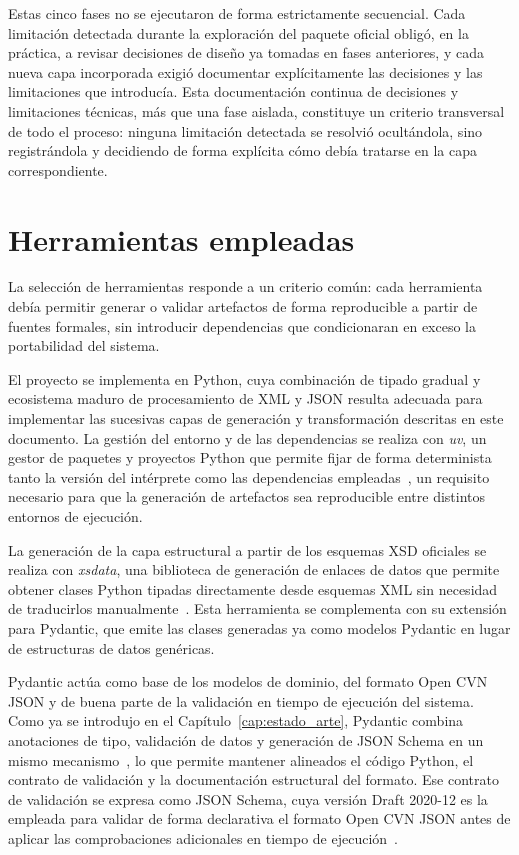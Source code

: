 Estas cinco fases no se ejecutaron de forma estrictamente secuencial. Cada
limitación detectada durante la exploración del paquete oficial obligó, en la
práctica, a revisar decisiones de diseño ya tomadas en fases anteriores, y cada
nueva capa incorporada exigió documentar explícitamente las decisiones y las
limitaciones que introducía. Esta documentación continua de decisiones y
limitaciones técnicas, más que una fase aislada, constituye un criterio
transversal de todo el proceso: ninguna limitación detectada se resolvió
ocultándola, sino registrándola y decidiendo de forma explícita cómo debía
tratarse en la capa correspondiente.

\section{Herramientas empleadas}
\label{sec:metodologia_herramientas}

La selección de herramientas responde a un criterio común: cada herramienta
debía permitir generar o validar artefactos de forma reproducible a partir de
fuentes formales, sin introducir dependencias que condicionaran en exceso la
portabilidad del sistema.

El proyecto se implementa en Python, cuya combinación de tipado gradual y
ecosistema maduro de procesamiento de XML y JSON resulta adecuada para
implementar las sucesivas capas de generación y transformación descritas en
este documento. La gestión del entorno y de las dependencias se realiza con
\textit{uv}, un gestor de paquetes y proyectos Python que permite fijar de
forma determinista tanto la versión del intérprete como las dependencias
empleadas~\cite{uv_docs}, un requisito necesario para que la generación de
artefactos sea reproducible entre distintos entornos de ejecución.

La generación de la capa estructural a partir de los esquemas XSD oficiales se
realiza con \textit{xsdata}, una biblioteca de generación de enlaces de datos
que permite obtener clases Python tipadas directamente desde esquemas XML sin
necesidad de traducirlos manualmente~\cite{xsdata_docs}. Esta herramienta se
complementa con su extensión para Pydantic, que emite las clases generadas ya
como modelos Pydantic en lugar de estructuras de datos genéricas.

Pydantic actúa como base de los modelos de dominio, del formato Open CVN JSON y
de buena parte de la validación en tiempo de ejecución del sistema. Como ya se
introdujo en el Capítulo~\ref{cap:estado_arte}, Pydantic combina anotaciones de
tipo, validación de datos y generación de JSON Schema en un mismo
mecanismo~\cite{pydantic_docs}, lo que permite mantener alineados el código
Python, el contrato de validación y la documentación estructural del formato.
Ese contrato de validación se expresa como JSON Schema, cuya versión Draft
2020-12 es la empleada para validar de forma declarativa el formato Open CVN
JSON antes de aplicar las comprobaciones adicionales en tiempo de
ejecución~\cite{json_schema_overview}.

